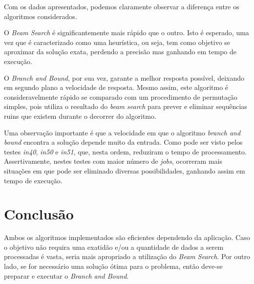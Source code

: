 \documentclass[
	11pt,				%
	oneside,			%
	a4paper,			%
	english,			%
	brazil,				%
	]{article}
\begin{document}
Com os dados apresentados, podemos claramente observar a diferença entre os algoritmos considerados.

O \textit{Beam Search} é significantemente mais rápido que o outro. Isto é esperado, uma vez que é caracterizado como uma heurística, ou seja, tem como objetivo se aproximar da solução exata, perdendo a precisão mas ganhando em tempo de execução.

O \textit{Branch and Bound}, por sua vez, garante a melhor resposta possível, deixando em segundo plano a velocidade de resposta. Mesmo assim, este algoritmo é consideravelmente rápido se comparado com um procedimento de permutação simples, pois utiliza o resultado do \textit{beam search} para prever e eliminar sequências ruins que existem durante o decorrer do algoritmo.

Uma observação importante é que a velocidade em que o algoritmo \textit{branch and bound} encontra a solução depende muito da entrada. Como pode ser visto pelos testes \textit{in40}, \textit{in50} e \textit{in51}, que, nesta ordem, reduziram o tempo de processamento. Assertivamente, nestes testes com maior número de \textit{jobs}, ocorreram mais situações em que pode ser eliminado diversas possibilidades, ganhando assim em tempo de execução.

\section{Conclusão}
Ambos os algoritmos implementados são eficientes dependendo da aplicação. Caso o objetivo não requira uma exatidão e/ou a quantidade de dados a serem processadas é vasta, seria mais apropriado a utilização do \textit{Beam Search}. Por outro lado, se for necessário uma solução ótima para o problema, então deve-se preparar e executar o \textit{Branch and Bound}.


{}


\end{document}
